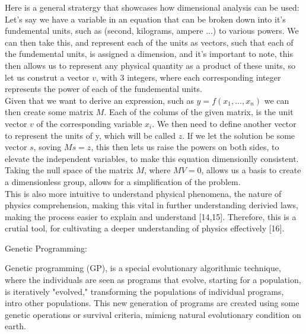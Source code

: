 \documentclass{article}
\begin{document}
Here is a general stratergy that showcases how dimensional analysis can be used:\\

Let's say we have a variable in an equation that can be broken down into it's fundemental units, such as (second, kilograms, ampere ...) to various powers. We can then take this, and represent each of the units as vectors, such that each of the fundemental units, is assigned a dimension, and it's important to note, this then allows us to represent any physical quantity as a product of these units, so let us construt a vector $v$, with $3$ integers, where each corresponding integer represents the power of each of the fundemental units.\\ 

Given that we want to derive an expression, such as $y = f(x_1, \dots, x_n)$  we can then create some matrix $M$. Each of the colums of the given matrix, is the unit vector $v$ of the corresponding variable $x_i$. We then need to define another vector to represent the units of y, which will be called $z$. If we let the solution be some vector $s$, soving $Ms = z$, this then lets us raise the powers on both sides, to elevate the independent variables, to make this equation dimensionlly consistent.\\ 

Taking the null space of the matrix $M$, where $MV = 0$, allows us a basis to create a dimensionless group, allows for a simplification of the problem.\\

This is also more intuitive to understand physical phenomena, the nature of physics comprehension, making this vital in further understanding derivied laws, making the process easier to explain and understand [14,15]. Therefore, this is a crutial tool, for cultivating a deeper understanding of physics effectively [16]. \\






\begin{center} 
  {\Large Genetic Programming:}
\end{center}


Genetic programming (GP), is a special evolutionary algorithmic technique, where the individuals are seen as programs that evolve, starting for a population, is iteratively "evolved," transforming the populations of individual programs, intro other populations. This new generation of programs are created using some genetic operations or survival criteria, mimicng natural evolutionary condition on earth.\\ 
\end{document}
